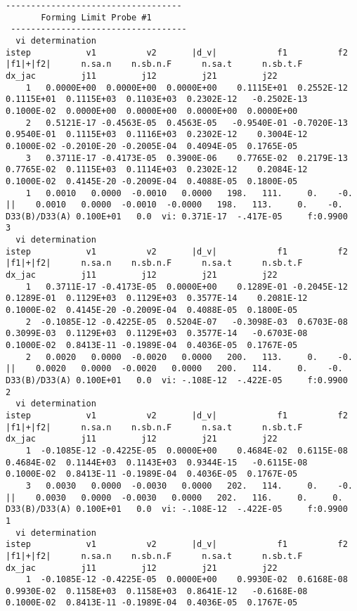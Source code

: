 \documentclass[12pt]{amsart}
\begin{document}
\begin{landscape}
\begin{lstlisting}[style=sh,caption=A portion of standard output stream invoked by IVGVAR32,label={code:stdout_32}]
 -----------------------------------
       Forming Limit Probe #1
 -----------------------------------
  vi determination
istep           v1          v2       |d_v|            f1          f2     |f1|+|f2|      n.sa.n    n.sb.n.F      n.sa.t      n.sb.t.F       dx_jac         j11         j12         j21         j22
    1   0.0000E+00  0.0000E+00  0.0000E+00    0.1115E+01  0.2552E-12    0.1115E+01  0.1115E+03  0.1103E+03  0.2302E-12   -0.2502E-13   0.1000E-02  0.0000E+00  0.0000E+00  0.0000E+00  0.0000E+00
    2   0.5121E-17 -0.4563E-05  0.4563E-05   -0.9540E-01 -0.7020E-13    0.9540E-01  0.1115E+03  0.1116E+03  0.2302E-12    0.3004E-12   0.1000E-02 -0.2010E-20 -0.2005E-04  0.4094E-05  0.1765E-05
    3   0.3711E-17 -0.4173E-05  0.3900E-06    0.7765E-02  0.2179E-13    0.7765E-02  0.1115E+03  0.1114E+03  0.2302E-12    0.2084E-12   0.1000E-02  0.4145E-20 -0.2009E-04  0.4088E-05  0.1800E-05
    1   0.0010   0.0000  -0.0010   0.0000   198.   111.     0.    -0.  ||    0.0010   0.0000  -0.0010  -0.0000   198.   113.     0.    -0. D33(B)/D33(A) 0.100E+01   0.0  vi: 0.371E-17  -.417E-05     f:0.9900    3
  vi determination
istep           v1          v2       |d_v|            f1          f2     |f1|+|f2|      n.sa.n    n.sb.n.F      n.sa.t      n.sb.t.F       dx_jac         j11         j12         j21         j22
    1   0.3711E-17 -0.4173E-05  0.0000E+00    0.1289E-01 -0.2045E-12    0.1289E-01  0.1129E+03  0.1129E+03  0.3577E-14    0.2081E-12   0.1000E-02  0.4145E-20 -0.2009E-04  0.4088E-05  0.1800E-05
    2  -0.1085E-12 -0.4225E-05  0.5204E-07   -0.3098E-03  0.6703E-08    0.3099E-03  0.1129E+03  0.1129E+03  0.3577E-14   -0.6703E-08   0.1000E-02  0.8413E-11 -0.1989E-04  0.4036E-05  0.1767E-05
    2   0.0020   0.0000  -0.0020   0.0000   200.   113.     0.    -0.  ||    0.0020   0.0000  -0.0020   0.0000   200.   114.     0.    -0. D33(B)/D33(A) 0.100E+01   0.0  vi: -.108E-12  -.422E-05     f:0.9900    2
  vi determination
istep           v1          v2       |d_v|            f1          f2     |f1|+|f2|      n.sa.n    n.sb.n.F      n.sa.t      n.sb.t.F       dx_jac         j11         j12         j21         j22
    1  -0.1085E-12 -0.4225E-05  0.0000E+00    0.4684E-02  0.6115E-08    0.4684E-02  0.1144E+03  0.1143E+03  0.9344E-15   -0.6115E-08   0.1000E-02  0.8413E-11 -0.1989E-04  0.4036E-05  0.1767E-05
    3   0.0030   0.0000  -0.0030   0.0000   202.   114.     0.    -0.  ||    0.0030   0.0000  -0.0030   0.0000   202.   116.     0.     0. D33(B)/D33(A) 0.100E+01   0.0  vi: -.108E-12  -.422E-05     f:0.9900    1
  vi determination
istep           v1          v2       |d_v|            f1          f2     |f1|+|f2|      n.sa.n    n.sb.n.F      n.sa.t      n.sb.t.F       dx_jac         j11         j12         j21         j22
    1  -0.1085E-12 -0.4225E-05  0.0000E+00    0.9930E-02  0.6168E-08    0.9930E-02  0.1158E+03  0.1158E+03  0.8641E-12   -0.6168E-08   0.1000E-02  0.8413E-11 -0.1989E-04  0.4036E-05  0.1767E-05
\end{lstlisting}
\end{landscape}
\end{document}
